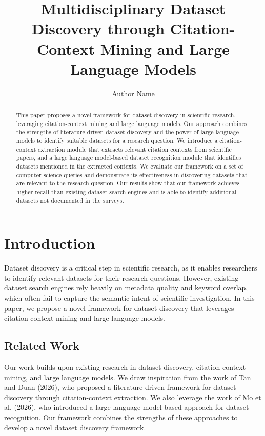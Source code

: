 \documentclass{article}
\begin{document}
        \title{Multidisciplinary Dataset Discovery through Citation-Context Mining and Large Language Models}

        \author{Author Name}

        \maketitle

        \begin{abstract}

        This paper proposes a novel framework for dataset discovery in scientific research, leveraging citation-context mining and large language models. Our approach combines the strengths of literature-driven dataset discovery and the power of large language models to identify suitable datasets for a research question. We introduce a citation-context extraction module that extracts relevant citation contexts from scientific papers, and a large language model-based dataset recognition module that identifies datasets mentioned in the extracted contexts. We evaluate our framework on a set of computer science queries and demonstrate its effectiveness in discovering datasets that are relevant to the research question. Our results show that our framework achieves higher recall than existing dataset search engines and is able to identify additional datasets not documented in the surveys.

        \end{abstract}

        \section{Introduction}

        Dataset discovery is a critical step in scientific research, as it enables researchers to identify relevant datasets for their research questions. However, existing dataset search engines rely heavily on metadata quality and keyword overlap, which often fail to capture the semantic intent of scientific investigation. In this paper, we propose a novel framework for dataset discovery that leverages citation-context mining and large language models.

        \subsection{Related Work}

        Our work builds upon existing research in dataset discovery, citation-context mining, and large language models. We draw inspiration from the work of Tan and Duan (2026), who proposed a literature-driven framework for dataset discovery through citation-context extraction. We also leverage the work of Mo et al. (2026), who introduced a large language model-based approach for dataset recognition. Our framework combines the strengths of these approaches to develop a novel dataset discovery framework.
\end{document}
